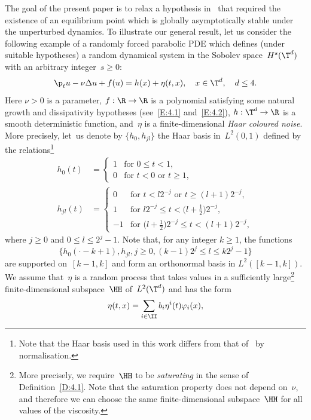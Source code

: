 The goal of the present paper is to relax a hypothesis in~\cite{KNS-2020} that required the existence of an equilibrium point which is globally asymptotically stable under the unperturbed dynamics. To illustrate our general result, let us consider the following example of a randomly forced parabolic PDE which defines (under suitable hypotheses) a random dynamical system in the Sobolev space~$H^s(\T^d)$ with an arbitrary integer~$s\ge0$:
\begin{equation} \label{rf-pde}
\p_t u-\nu\Delta u+f(u)=h(x)+\eta(t,x), \quad x\in\T^d, \quad d\le 4.
\end{equation}
Here $\nu>0$ is a parameter, $f:\R\to\R$ is a polynomial satisfying some natural growth and dissipativity hypotheses (see~\eqref{E:4.1} and~\eqref{E:4.2}), $h: \T^d\to \R$ is a smooth deterministic function, and~$\eta$ is a finite-dimensional \emph{Haar coloured noise}. More precisely, let~us denote by $\{h_0,h_{jl}\}$ the Haar basis in~$L^2(0,1)$ defined by the relations\footnote{Note that the Haar basis used in this work differs from that of~\cite[\S 22]{lamperti1996} by normalisation.}
\begin{align*}
h_0(t)&=
\begin{cases}
1 & \text{for $0\le t<1$},\\
0 & \text{for $t<0$ or $t\ge1$},
\end{cases}
\\
h_{jl}(t)&=
\begin{cases}
0 & \text{for $t<l2^{-j}$ or $t\ge (l+1)2^{-j}$},\\
1 & \text{for $l2^{-j}\le t<\bigl(l+\tfrac12\bigr)2^{-j}$},\\
-1 & \text{for $\bigl(l+\tfrac12\bigr)2^{-j}\le t<(l+1)2^{-j}$},
\end{cases}
\end{align*}
where $j\ge0$ and $0\le l\le 2^j-1$. Note that, for any integer $k\ge1$, the functions
\[
\bigl\{h_0(\cdot-k+1),h_{jl}, j\ge0,(k-1)2^j\le l\le k2^j-1\bigr\}
\]
are supported on~$[k-1,k]$ and form an orthonormal basis in $L^2([k-1,k])$. We assume that~$\eta$ is a random process that takes values in a sufficiently large\footnote{More precisely, we require~$\HH$ to be \emph{saturating} in the sense of Definition~\ref{D:4.1}. Note that the saturation property does not depend on~$\nu$, and therefore we can choose the same finite-dimensional subspace~$\HH$ for all values of the viscosity.} finite-dimensional subspace~$\HH$ of~$L^2(\T^d)$ and has the form
\begin{equation} \label{eta-intro}
\eta(t,x)= \sum_{i\in\II}b_i \eta^i(t)\varphi_i(x),
\end{equation}
